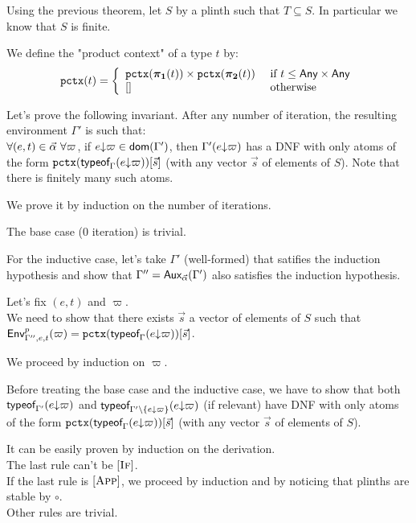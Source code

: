 \documentclass[a4paper]{article}
\theoremstyle{definition}
\begin{document}
    Using the previous theorem, let $S$ by a plinth such that $T \subseteq S$. In particular we know that $S$ is finite.

    We define the "product context" of a type $t$ by:
    \[
      \texttt{pctx}(t)=\left\{
        \begin{array}{ll}
          \texttt{pctx}(\boldsymbol{\pi}_{\boldsymbol 1}(t))\times \texttt{pctx}(\boldsymbol{\pi}_{\boldsymbol 2}(t)) & \text{ if } t \leq \textsf{Any}\times \textsf{Any}\\
          {[}] & \text{ otherwise}
        \end{array}  
      \right.
    \]

    Let's prove the following invariant. After any number of iteration, the resulting environment $\Gamma'$ is such that:\\
    $\forall (e,t) \in \vec \alpha\ \forall \varpi$, if $e{\downarrow}\varpi \in \textsf{dom}(\Gamma')$, then $\Gamma'(e{\downarrow}\varpi)$ has a DNF with only atoms of the form
    $\texttt{pctx}(\textsf{typeof}_{\Gamma}(e{\downarrow}\varpi))[\vec s]$ (with any vector $\vec s$ of elements of $S$).
    Note that there is finitely many such atoms.
    
    We prove it by induction on the number of iterations.

    The base case (0 iteration) is trivial.

    For the inductive case, let's take $\Gamma'$ (well-formed) that satifies the induction hypothesis
    and show that $\Gamma'' = \textsf{Aux}_{\vec \alpha}(\Gamma')$ also satisfies the induction hypothesis.

    Let's fix $(e,t)$ and $\varpi$.\\
    We need to show that there exists $\vec s$ a vector of elements of $S$ such that $\textsf{Env}^{p}_{\Gamma'',e,t} (\varpi) = \texttt{pctx}(\textsf{typeof}_{\Gamma}(e{\downarrow}\varpi))[\vec s]$.
    
    We proceed by induction on $\varpi$.

    Before treating the base case and the inductive case, we have to show that both $\textsf{typeof}_{\Gamma'}(e{\downarrow}\varpi)$
    and $\textsf{typeof}_{\Gamma'\setminus\{e{\downarrow}\varpi\}}(e{\downarrow}\varpi)$ (if relevant) have DNF with only atoms of the form
    $\texttt{pctx}(\textsf{typeof}_{\Gamma}(e{\downarrow}\varpi))[\vec s]$ (with any vector $\vec s$ of elements of $S$).

    It can be easily proven by induction on the derivation.\\
    The last rule can't be $[\textsc{If}]$.\\
    If the last rule is $[\textsc{App}]$, we proceed by induction and by noticing that plinths are stable by $\circ$.\\
    Other rules are trivial.
\end{document}
